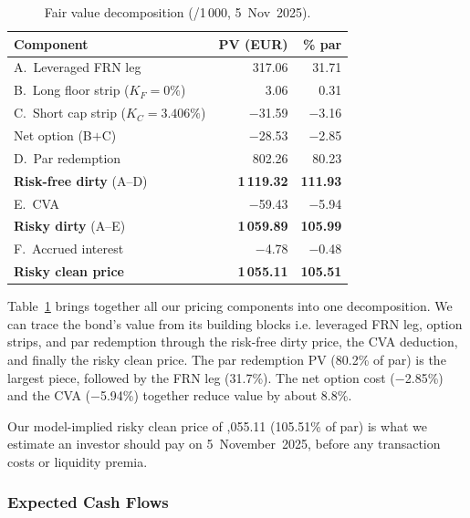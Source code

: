\documentclass[11pt,a4paper]{article}
\begin{document}
\begin{table}
  \vspace{-10pt}
  \centering\small
  \begin{tabular}{@{}lrr@{}}
    \toprule
    \textbf{Component} &
    \textbf{PV (EUR)} &
    \textbf{\% par} \\
    \midrule
    A.~Leveraged FRN leg
      & 317.06 & 31.71 \\
    B.~Long floor strip ($K_F\!=\!0\%$)
      &   3.06 &  0.31 \\
    C.~Short cap strip ($K_C\!=\!3.406\%$)
      & $-$31.59 & $-$3.16 \\
    \quad Net option (B$+$C)
      & $-$28.53 & $-$2.85 \\
    D.~Par redemption
      & 802.26 & 80.23 \\
    \midrule
    \textbf{Risk-free dirty} (A--D)
      & \textbf{1\,119.32} & \textbf{111.93} \\
    E.~CVA
      & $-$59.43 & $-$5.94 \\
    \midrule
    \textbf{Risky dirty} (A--E)
      & \textbf{1\,059.89} & \textbf{105.99} \\
    F.~Accrued interest
      & $-$4.78 & $-$0.48 \\
    \midrule
    \textbf{Risky clean price}
      & \textbf{1\,055.11} & \textbf{105.51} \\
    \bottomrule
  \end{tabular}
  \vspace{2pt}
  \caption{Fair value decomposition (\texteuro/1\,000, 5~Nov~2025).}
  \label{tab:q8_fair_value}
  \vspace{-10pt}
\end{table}

Table~\ref{tab:q8_fair_value} brings together all our pricing
components into one decomposition.  We can trace the bond's value from
its building blocks i.e. leveraged FRN leg, option strips, and par redemption through the risk-free dirty price, the CVA deduction, and finally the risky clean price.  The par redemption PV (80.2\% of par)
is the largest piece, followed by the FRN leg (31.7\%).  The net option
cost ($-$2.85\%) and the CVA ($-$5.94\%) together reduce value by about 8.8\%.

Our model-implied risky clean price of ,055.11 (105.51\% of par)
is what we estimate an investor should pay on 5~November~2025, before
any transaction costs or liquidity premia.

\subsubsection{Expected Cash Flows}
\label{sssec:q9_cashflows}
\end{document}
